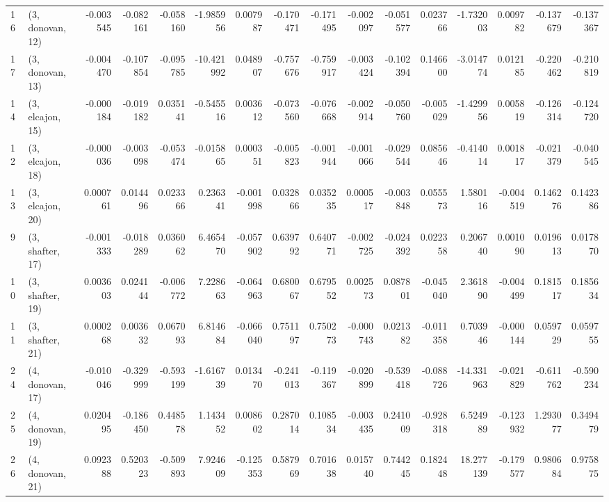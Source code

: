 \begin{tabular}{llrrrrrrrrrrrrrr}
16 &  (3, donovan, 12) &  -0.003545 & -0.082161 & -0.058160 &  -1.985956 &  0.007987 &  -0.170471 & -0.171495 & -0.002097 & -0.051577 &  0.023766 &  -1.732003 &  0.009782 & -0.137679 & -0.137367 \\
17 &  (3, donovan, 13) &  -0.004470 & -0.107854 & -0.095785 & -10.421992 &  0.048907 &  -0.757676 & -0.759917 & -0.003424 & -0.102394 &  0.146600 &  -3.014774 &  0.012185 & -0.220462 & -0.210819 \\
14 &  (3, elcajon, 15) &  -0.000184 & -0.019182 &  0.035141 &  -0.545516 &  0.003612 &  -0.073560 & -0.076668 & -0.002914 & -0.050760 & -0.005029 &  -1.429956 &  0.005819 & -0.126314 & -0.124720 \\
12 &  (3, elcajon, 18) &  -0.000036 & -0.003098 & -0.053474 &  -0.015865 &  0.000351 &  -0.005823 & -0.001944 & -0.001066 & -0.029544 &  0.085646 &  -0.414014 &  0.001817 & -0.021379 & -0.040545 \\
13 &  (3, elcajon, 20) &   0.000761 &  0.014496 &  0.023366 &   0.236341 & -0.001998 &   0.032866 &  0.035235 &  0.000517 & -0.003848 &  0.055573 &   1.580116 & -0.004519 &  0.146276 &  0.142386 \\
9  &  (3, shafter, 17) &  -0.001333 & -0.018289 &  0.036062 &   6.465470 & -0.057902 &   0.639792 &  0.640771 & -0.002725 & -0.024392 &  0.022358 &   0.206740 &  0.001090 &  0.019613 &  0.017870 \\
10 &  (3, shafter, 19) &   0.003603 &  0.024144 & -0.006772 &   7.228663 & -0.064963 &   0.680067 &  0.679552 &  0.002573 &  0.087801 & -0.045040 &   2.361890 & -0.004499 &  0.181517 &  0.185634 \\
11 &  (3, shafter, 21) &   0.000268 &  0.003632 &  0.067093 &   6.814684 & -0.066040 &   0.751197 &  0.750273 & -0.000743 &  0.021382 & -0.011358 &   0.703946 & -0.000144 &  0.059729 &  0.059755 \\
24 &  (4, donovan, 17) &  -0.010046 & -0.329999 & -0.593199 &  -1.616739 &  0.013470 &  -0.241013 & -0.119367 & -0.020899 & -0.539418 & -0.088726 & -14.331963 & -0.021829 & -0.611762 & -0.590234 \\
25 &  (4, donovan, 19) &   0.020495 & -0.186450 &  0.448578 &   1.143452 &  0.008602 &   0.287014 &  0.108534 & -0.003435 &  0.241009 & -0.928318 &   6.524989 & -0.123932 &  1.293077 &  0.349479 \\
26 &  (4, donovan, 21) &   0.092388 &  0.520323 & -0.509893 &   7.924609 & -0.125353 &   0.587969 &  0.701638 &  0.015740 &  0.744245 &  0.182448 &  18.277139 & -0.179577 &  0.980684 &  0.975875 \\

\end{tabular}
